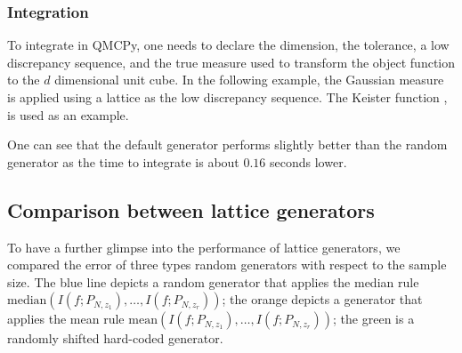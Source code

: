 \pagebreak

\subsubsection*{Integration}

To integrate in QMCPy, one needs to declare the dimension, the tolerance, a low discrepancy sequence, and the true measure used to transform the object function to the $d$ dimensional unit cube. In the following example, the Gaussian measure is applied using a lattice as the low discrepancy sequence. The Keister function \cite{Kei96}, is used as an example. 







\noindent\begin{minipage}{.45\textwidth}

\end{minipage}\hfill
\begin{minipage}{.45\textwidth}

\end{minipage}

One can see that the default generator performs slightly better than the random generator as the time to integrate is about $0.16$ seconds lower. 

\pagebreak



\subsection*{Comparison between lattice generators}
To have a further glimpse into the performance of lattice generators, we compared the error of three types random generators with respect to the sample size. The blue line depicts a random generator that applies the median rule $\mathrm{median}(I(f;P_{N,z_1}),\dots,I(f;P_{N,z_r}))$; the orange depicts a generator that applies the mean rule $\mathrm{mean}(I(f;P_{N,z_1}),\dots,I(f;P_{N,z_r}))$; the green is a randomly shifted hard-coded generator. 


